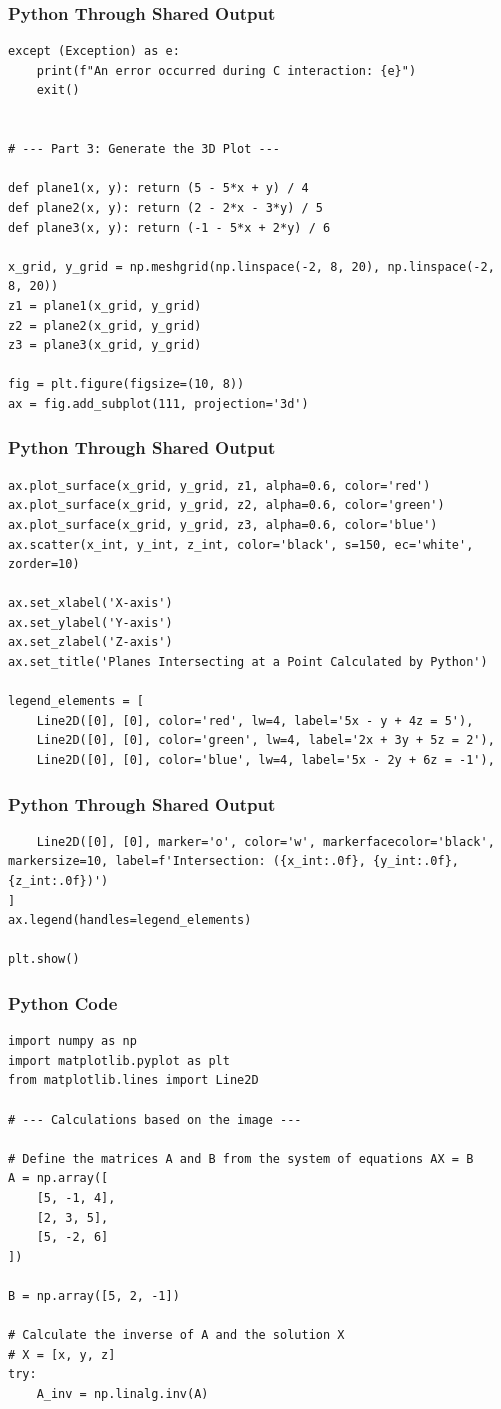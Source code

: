 \documentclass{beamer}
\begin{document}
\begin{frame}[fragile]
\frametitle{Python Through Shared Output}
\begin{lstlisting} 
except (Exception) as e:
    print(f"An error occurred during C interaction: {e}")
    exit()


# --- Part 3: Generate the 3D Plot ---

def plane1(x, y): return (5 - 5*x + y) / 4
def plane2(x, y): return (2 - 2*x - 3*y) / 5
def plane3(x, y): return (-1 - 5*x + 2*y) / 6

x_grid, y_grid = np.meshgrid(np.linspace(-2, 8, 20), np.linspace(-2, 8, 20))
z1 = plane1(x_grid, y_grid)
z2 = plane2(x_grid, y_grid)
z3 = plane3(x_grid, y_grid)

fig = plt.figure(figsize=(10, 8))
ax = fig.add_subplot(111, projection='3d')
\end{lstlisting}
\end{frame}
\begin{frame}[fragile]
\frametitle{Python Through Shared Output}
\begin{lstlisting} 
ax.plot_surface(x_grid, y_grid, z1, alpha=0.6, color='red')
ax.plot_surface(x_grid, y_grid, z2, alpha=0.6, color='green')
ax.plot_surface(x_grid, y_grid, z3, alpha=0.6, color='blue')
ax.scatter(x_int, y_int, z_int, color='black', s=150, ec='white', zorder=10)

ax.set_xlabel('X-axis')
ax.set_ylabel('Y-axis')
ax.set_zlabel('Z-axis')
ax.set_title('Planes Intersecting at a Point Calculated by Python')

legend_elements = [
    Line2D([0], [0], color='red', lw=4, label='5x - y + 4z = 5'),
    Line2D([0], [0], color='green', lw=4, label='2x + 3y + 5z = 2'),
    Line2D([0], [0], color='blue', lw=4, label='5x - 2y + 6z = -1'),
    \end{lstlisting}
\end{frame}
\begin{frame}[fragile]
\frametitle{Python Through Shared Output}
\begin{lstlisting} 
    Line2D([0], [0], marker='o', color='w', markerfacecolor='black', markersize=10, label=f'Intersection: ({x_int:.0f}, {y_int:.0f}, {z_int:.0f})')
]
ax.legend(handles=legend_elements)

plt.show()
 \end{lstlisting}
\end{frame}
\begin{frame}[fragile]
\frametitle{Python Code}
\begin{lstlisting} 
import numpy as np
import matplotlib.pyplot as plt
from matplotlib.lines import Line2D

# --- Calculations based on the image ---

# Define the matrices A and B from the system of equations AX = B
A = np.array([
    [5, -1, 4],
    [2, 3, 5],
    [5, -2, 6]
])

B = np.array([5, 2, -1])

# Calculate the inverse of A and the solution X
# X = [x, y, z]
try:
    A_inv = np.linalg.inv(A)
     \end{lstlisting}
\end{frame}
\end{document}
